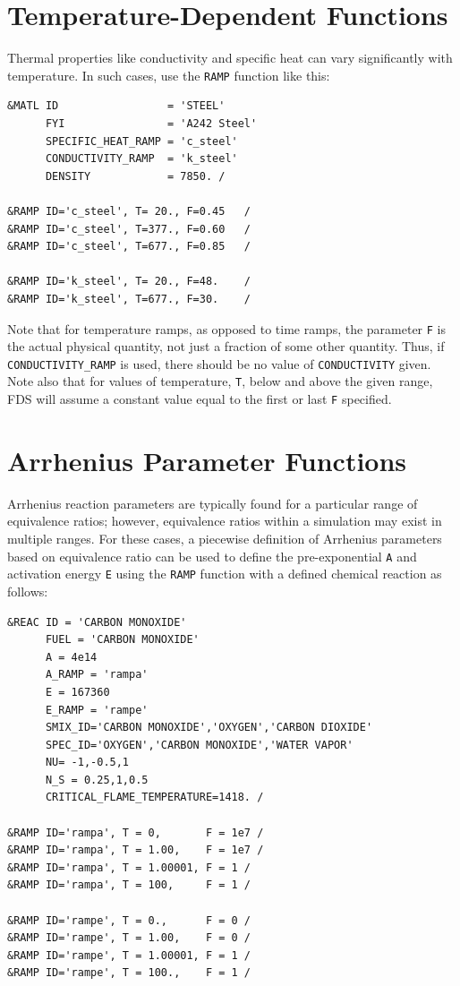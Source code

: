 \documentclass[11pt]{book}
\newcommand{\ct}{\tt\small}
\begin{document}
\newpage

\section{Temperature-Dependent Functions}

\label{info:RAMP_Temperature}

Thermal properties like conductivity and specific heat can vary significantly with temperature. In such cases, use
the {\ct RAMP} function like this:

\footnotesize
\begin{verbatim}
&MATL ID                 = 'STEEL'
      FYI                = 'A242 Steel'
      SPECIFIC_HEAT_RAMP = 'c_steel'
      CONDUCTIVITY_RAMP  = 'k_steel'
      DENSITY            = 7850. /

&RAMP ID='c_steel', T= 20., F=0.45   /
&RAMP ID='c_steel', T=377., F=0.60   /
&RAMP ID='c_steel', T=677., F=0.85   /

&RAMP ID='k_steel', T= 20., F=48.    /
&RAMP ID='k_steel', T=677., F=30.    /
\end{verbatim}
\normalsize

\noindent
Note that for temperature ramps, as opposed to time ramps, the parameter {\ct F} is the actual physical quantity, not just
a fraction of some other quantity. Thus, if {\ct CONDUCTIVITY\_RAMP} is used, there should be no
value of {\ct CONDUCTIVITY} given. Note also that for values of temperature, {\ct T}, below and above the
given range, FDS will assume a constant value equal to the first or last {\ct F} specified.

\section{Arrhenius Parameter Functions}

\label{info:RAMP_Arrhenius}

Arrhenius reaction parameters are typically found for a particular range of equivalence ratios; however, equivalence ratios within a simulation may exist in multiple ranges. For these cases, a piecewise definition of Arrhenius parameters based on equivalence ratio can be used to define the pre-exponential {\ct A} and activation energy {\ct E} using the {\ct RAMP} function with a defined chemical reaction as follows:

\footnotesize
\begin{verbatim}
&REAC ID = 'CARBON MONOXIDE'
      FUEL = 'CARBON MONOXIDE'
      A = 4e14
      A_RAMP = 'rampa'
      E = 167360       
      E_RAMP = 'rampe'
      SMIX_ID='CARBON MONOXIDE','OXYGEN','CARBON DIOXIDE'
      SPEC_ID='OXYGEN','CARBON MONOXIDE','WATER VAPOR'
      NU= -1,-0.5,1
      N_S = 0.25,1,0.5
      CRITICAL_FLAME_TEMPERATURE=1418. /

&RAMP ID='rampa', T = 0,       F = 1e7 /
&RAMP ID='rampa', T = 1.00,    F = 1e7 /
&RAMP ID='rampa', T = 1.00001, F = 1 /
&RAMP ID='rampa', T = 100,     F = 1 /

&RAMP ID='rampe', T = 0.,      F = 0 /
&RAMP ID='rampe', T = 1.00,    F = 0 /
&RAMP ID='rampe', T = 1.00001, F = 1 /
&RAMP ID='rampe', T = 100.,    F = 1 /
\end{verbatim}
\normalsize
\end{document}
